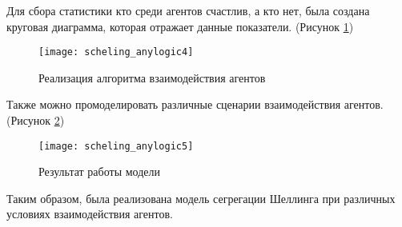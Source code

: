 \newpage

Для сбора статистики кто среди агентов счастлив, а кто нет, была создана круговая диаграмма, которая отражает данные показатели. (Рисунок \ref{fig:scheling_anylogic4})
\begin{figure}[h]
	\centering \texttt{[image: scheling\_anylogic4]}
	\caption{Реализация алгоритма взаимодействия агентов}
	\label{fig:scheling_anylogic4}
\end{figure}

Также можно промоделировать различные сценарии взаимодействия агентов. (Рисунок \ref{fig:scheling_anylogic5})
\begin{figure}[h]
	\centering \texttt{[image: scheling\_anylogic5]}
	\caption{Результат работы модели}
	\label{fig:scheling_anylogic5}
\end{figure}

Таким образом, была реализована модель сегрегации Шеллинга при различных условиях взаимодействия агентов.